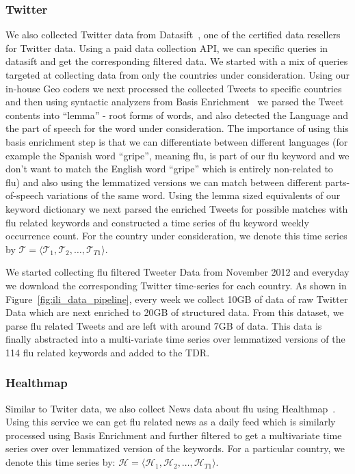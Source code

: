 \subsubsection{Twitter}
We also collected Twitter data from Datasift~\cite{Twitter:2013}, 
one of the certified data resellers for Twitter data. Using a paid data collection 
API, we can specific queries in datasift and get the corresponding filtered data.
We started with a mix of queries targeted at collecting data from only the 
countries under consideration. Using our in-house Geo coders we next processed the 
collected Tweets to specific countries and then using syntactic analyzers from 
Basis Enrichment~\cite{Basis:2013} we parsed the Tweet contents into ``lemma'' - root forms of words, 
and also detected the Language and the part of speech for the word under consideration. 
The importance of using this basis enrichment step is that we can differentiate 
between different languages (for example the Spanish word ``gripe'', meaning flu,
is part of our flu keyword and we don't want to match the English word 
``gripe'' which is entirely non-related to flu) and also using the lemmatized versions
we can match between different parts-of-speech variations of the same word. Using the 
lemma sized equivalents of our keyword dictionary we next parsed the enriched Tweets
for possible matches with flu related keywords and constructed a time series of 
flu keyword weekly occurrence count. For the country under consideration, we denote 
this time series by
$\mathcal{T} = \langle \mathcal{T}_1, \mathcal{T}_2, \dots, \mathcal{T}_{T1} \rangle$.

We started collecting flu filtered Tweeter Data from November 2012 and everyday 
we download the corresponding Twitter time-series for each country. As shown in 
Figure~\ref{fig:ili_data_pipeline}, every week we collect 10GB of data of raw Twitter Data which 
are next enriched to 20GB of structured data. From this dataset, we parse flu related Tweets and 
are left with around 7GB of data. This data is finally abstracted into a multi-variate time series
over lemmatized versions of the 114 flu related keywords and added to the TDR. 

\subsubsection{Healthmap}
Similar to Twiter data, we also collect News data about flu using
Healthmap~\cite{HM:2013}.
Using this service we can get flu related news as a daily feed which is similarly processed using
Basis Enrichment and further filtered to get a multivariate time series over over
lemmatized version of the keywords. For a particular country, we denote this time 
series by:
$\mathcal{H} = \langle \mathcal{H}_1, \mathcal{H}_2, \dots, \mathcal{H}_{T1} \rangle$.

